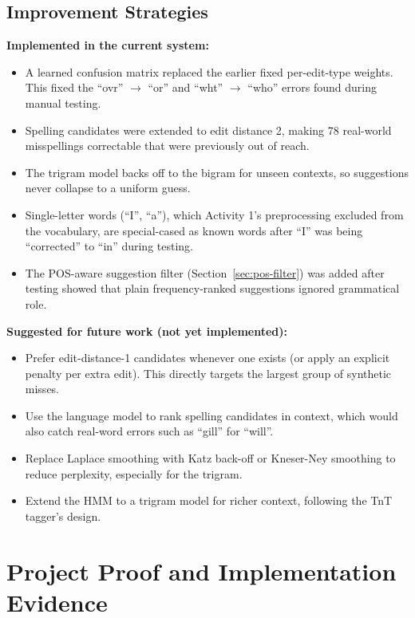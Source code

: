 \documentclass[12pt,a4paper]{report}
\begin{document}
\section{Improvement Strategies}

\textbf{Implemented in the current system:}
\begin{itemize}
    \item A learned confusion matrix replaced the earlier fixed
    per-edit-type weights. This fixed the ``ovr'' $\rightarrow$ ``or''
    and ``wht'' $\rightarrow$ ``who'' errors found during manual testing.
    \item Spelling candidates were extended to edit distance 2, making 78
    real-world misspellings correctable that were previously out of reach.
    \item The trigram model backs off to the bigram for unseen contexts,
    so suggestions never collapse to a uniform guess.
    \item Single-letter words (``I'', ``a''), which Activity 1's
    preprocessing excluded from the vocabulary, are special-cased as
    known words after ``I'' was being ``corrected'' to ``in'' during
    testing.
    \item The POS-aware suggestion filter (Section~\ref{sec:pos-filter})
    was added after testing showed that plain frequency-ranked
    suggestions ignored grammatical role.
\end{itemize}

\textbf{Suggested for future work (not yet implemented):}
\begin{itemize}
    \item Prefer edit-distance-1 candidates whenever one exists (or
    apply an explicit penalty per extra edit). This directly targets
    the largest group of synthetic misses.
    \item Use the language model to rank spelling candidates in context,
    which would also catch real-word errors such as ``gill'' for
    ``will''.
    \item Replace Laplace smoothing with Katz back-off or Kneser-Ney
    smoothing to reduce perplexity, especially for the trigram.
    \item Extend the HMM to a trigram model for richer context,
    following the TnT tagger's design.
\end{itemize}

\chapter{Project Proof and Implementation Evidence}
\end{document}
